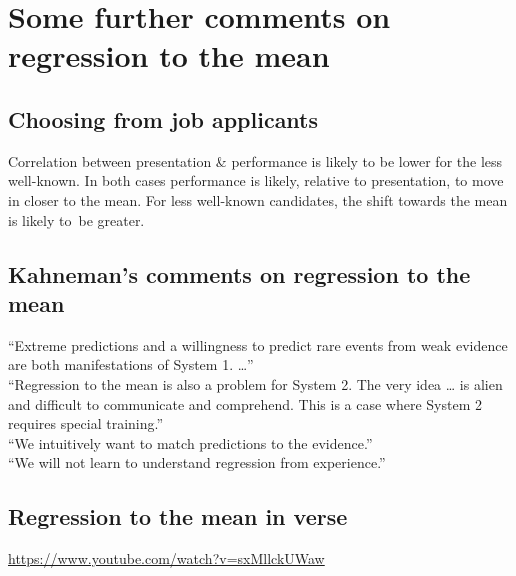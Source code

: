 \documentclass[
  10pt,
  b5paper]{book}
\begin{document}
\hypertarget{some-further-comments-on-regression-to-the-mean}{%
\section{Some further comments on regression to the mean}\label{some-further-comments-on-regression-to-the-mean}}

\hypertarget{choosing-from-job-applicants}{%
\subsection*{Choosing from job applicants}\label{choosing-from-job-applicants}}

Correlation between presentation \& performance is likely to
be lower for the less well-known. In both cases performance
is likely, relative to presentation, to move in closer to the
mean. For less well-known candidates, the shift towards the
mean is likely to~be greater.

\hypertarget{kahnemans-comments-on-regression-to-the-mean}{%
\subsection*{Kahneman's comments on regression to the mean}\label{kahnemans-comments-on-regression-to-the-mean}}

``Extreme predictions and a willingness to predict rare events from
weak evidence are both manifestations of System 1. \ldots{}''\\
``Regression to the mean is also a problem for System 2. The very idea
\ldots{} is alien and difficult to communicate and comprehend. This is a
case where System 2 requires special training.''\\
``We intuitively want to match predictions to the evidence.''\\
``We will not learn to understand regression from experience.''

\hypertarget{regression-to-the-mean-in-verse}{%
\subsection*{Regression to the mean in verse}\label{regression-to-the-mean-in-verse}}

\url{https://www.youtube.com/watch?v=sxMllckUWaw}
\end{document}
